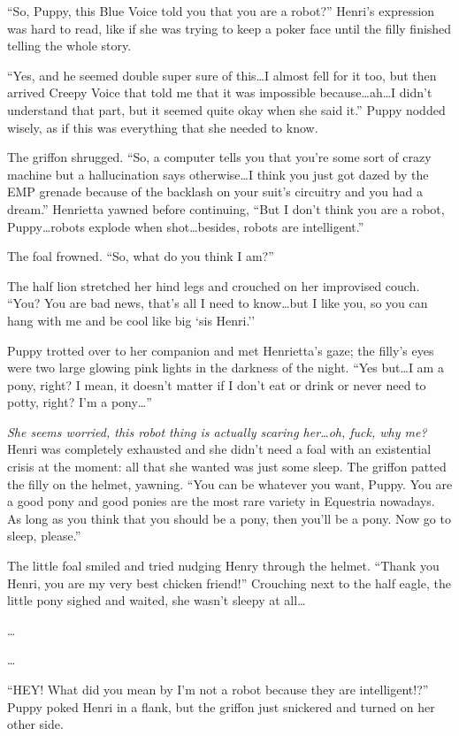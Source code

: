 ``So, Puppy, this Blue Voice told you that you are a robot?'' Henri's expression was hard to read, like if she was trying to keep a poker face until the filly finished telling the whole story.

``Yes, and he seemed double super sure of this\dots I almost fell for it too, but then arrived Creepy Voice that told me that it was impossible because\dots ah\dots I didn't understand that part, but it seemed quite okay when she said it.'' Puppy nodded wisely, as if this was everything that she needed to know.

The griffon shrugged. ``So, a computer tells you that you're some sort of crazy machine but a hallucination says otherwise\dots I think you just got dazed by the EMP grenade because of the backlash on your suit's circuitry and you had a dream.'' Henrietta yawned before continuing, ``But I don't think you are a robot, Puppy\dots robots explode when shot\dots besides, robots are intelligent.''

The foal frowned. ``So, what do you think I am?''

The half lion stretched her hind legs and crouched on her improvised couch. ``You? You are bad news, that's all I need to know\dots but I like you, so you can hang with me and be cool like big `sis Henri.''

Puppy trotted over to her companion and met Henrietta's gaze; the filly's eyes were two large glowing pink lights in the darkness of the night. ``Yes but\dots I am a pony, right? I mean, it doesn't matter if I don't eat or drink or never need to potty, right? I'm a pony\dots''

\emph{She seems worried, this robot thing is actually scaring her\dots oh, fuck, why me?} Henri was completely exhausted and she didn't need a foal with an existential crisis at the moment: all that she wanted was just some sleep. The griffon patted the filly on the helmet, yawning. ``You can be whatever you want, Puppy. You are a good pony and good ponies are the most rare variety in Equestria nowadays. As long as you think that you should be a pony, then you'll be a pony. Now go to sleep, please.''

The little foal smiled and tried nudging Henry through the helmet. ``Thank you Henri, you are my very best chicken friend!'' Crouching next to the half eagle, the little pony sighed and waited, she wasn't sleepy at all\dots

\ldots{}

\ldots{}

``HEY! What did you mean by I'm not a robot because they are intelligent!?'' Puppy poked Henri in a flank, but the griffon just snickered and turned on her other side.


